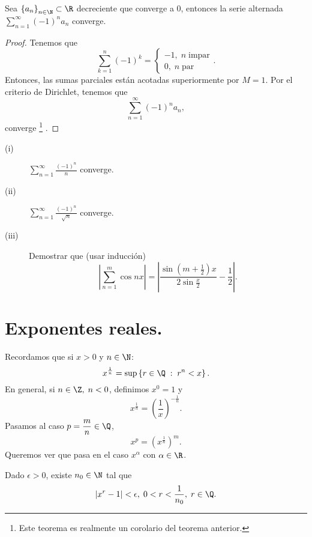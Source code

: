 \begin{ftheorem}
	\normalfont Sea $\displaystyle \left\{ a_{n}\right\} _{n\in\N}\subset\R $ decreciente que converge a 0, entonces la serie alternada $\displaystyle \sum^{\infty}_{n = 1}\left(-1\right)^{n}a_{n} $ converge.
\end{ftheorem}
\begin{proof}
Tenemos que 
\[\sum^{n}_{k=1}\left(-1\right)^{k} = 
\begin{cases}
-1, \; n \; \text{impar}\\
0, \; n \; \text{par} 
\end{cases}
.\]
Entonces, las sumas parciales están acotadas superiormente por $\displaystyle M = 1 $. Por el criterio de Dirichlet, tenemos que 
\[\sum^{\infty}_{n = 1}\left(-1\right)^{n}a_{n} ,\]
converge \footnote{Este teorema es realmente un corolario del teorema anterior.} .
\end{proof}
\begin{eg}
\normalfont 
\begin{description}
\item[(i)] $\displaystyle \sum^{\infty}_{n = 1}\frac{\left(-1\right)^{n}}{n} $ converge.
\item[(ii)] $\displaystyle \sum^{\infty}_{n = 1}\frac{\left(-1\right)^{n}}{\sqrt{n}} $ converge.
\item[(iii)] Demostrar que (usar inducción)
	\[ \left|\sum^{m}_{n = 1}\cos nx\right| = \left|\frac{\sin\left(m + \frac{1}{2}\right)x}{2\sin \frac{x}{2}}-\frac{1}{2}\right| .\]
\end{description}
\end{eg}

\section{Exponentes reales.}
Recordamos que si $\displaystyle x > 0 $ y $\displaystyle n \in \N $:
\[x^{\frac{1}{n}} = \sup \left\{ r \in \Q \; : \; r^{n} < x\right\}  .\]
En general, si $\displaystyle n \in \Z, \; n < 0 $, definimos $\displaystyle x^{0} = 1 $ y
\[ x^{\frac{1}{n}} = \left(\frac{1}{x}\right)^{-\frac{1}{n}}.\]
Pasamos al caso $\displaystyle p = \frac{m}{n}\in \Q $, 
\[x^{p} = \left(x^{\frac{1}{n}}\right)^{m} .\]
Queremos ver que pasa en el caso $\displaystyle x^{\alpha } $ con $\displaystyle \alpha \in \R $. 
\begin{flema}[]
\normalfont Dado $\displaystyle \epsilon > 0 $, existe $\displaystyle n_{0} \in \N $ tal que 
\[ \left|x^{r}-1\right| < \epsilon, \; 0 < r < \frac{1}{n_{0}}, \; r \in \Q .\]
\end{flema}

